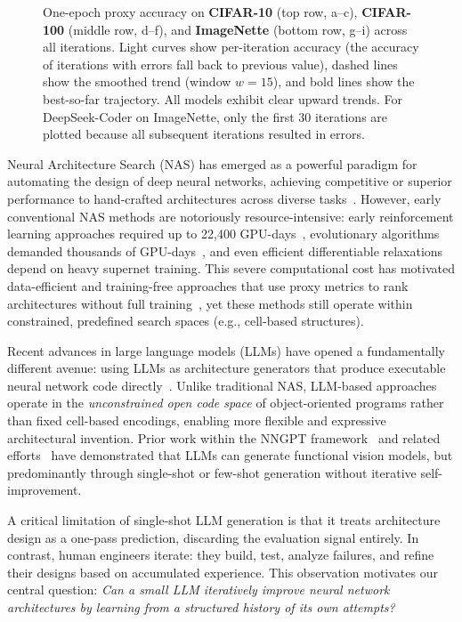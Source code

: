 \documentclass[10pt,twocolumn,letterpaper]{article}
\begin{document}
\begin{figure}[t!]
		\caption{One-epoch proxy accuracy on \textbf{CIFAR-10} (top row, a--c), \textbf{CIFAR-100} (middle row, d--f), and \textbf{ImageNette} (bottom row, g--i) across all iterations. Light curves show per-iteration accuracy (the accuracy of iterations with errors fall back to previous value), dashed lines show the smoothed trend (window $w{=}15$), and bold lines show the best-so-far trajectory. All models exhibit clear upward trends. For DeepSeek-Coder on ImageNette, only the first 30 iterations are plotted because all subsequent iterations resulted in errors.}
		\label{fig:accuracy_combined}
	\end{figure}
	
	Neural Architecture Search (NAS) has emerged as a powerful paradigm for automating the design of deep neural networks, achieving competitive or superior performance to hand-crafted architectures across diverse tasks~\cite{Zoph2017,Real2019,Liu2019DARTS}. However, early conventional NAS methods are notoriously resource-intensive: early reinforcement learning approaches required up to 22,400 GPU-days~\cite{Zoph2017}, evolutionary algorithms demanded thousands of GPU-days~\cite{Real2019}, and even efficient differentiable relaxations~\cite{Liu2019DARTS} depend on heavy supernet training. This severe computational cost has motivated data-efficient and training-free approaches that use proxy metrics to rank architectures without full training~\cite{Mellor2021,Li2024ZeroShot}, yet these methods still operate within constrained, predefined search spaces (e.g., cell-based structures).
	
	Recent advances in large language models (LLMs) have opened a fundamentally different avenue: using LLMs as architecture generators that produce executable neural network code directly~\cite{ABrain.NNGPT,ABrain.Architect,ABrain.Prompt}. Unlike traditional NAS, LLM-based approaches operate in the \emph{unconstrained open code space} of object-oriented programs rather than fixed cell-based encodings, enabling more flexible and expressive architectural invention. Prior work within the NNGPT framework~\cite{ABrain.NNGPT} and related efforts~\cite{ABrain.NN-Captioning_2025,ABrain.NNGPT-Fractal,ABrain.CV_Channel} have demonstrated that LLMs can generate functional vision models, but predominantly through single-shot or few-shot generation without iterative self-improvement.
	
	A critical limitation of single-shot LLM generation is that it treats architecture design as a one-pass prediction, discarding the evaluation signal entirely. In contrast, human engineers iterate: they build, test, analyze failures, and refine their designs based on accumulated experience. This observation motivates our central question: \emph{Can a small LLM iteratively improve neural network architectures by learning from a structured history of its own attempts?}
	
\end{document}
